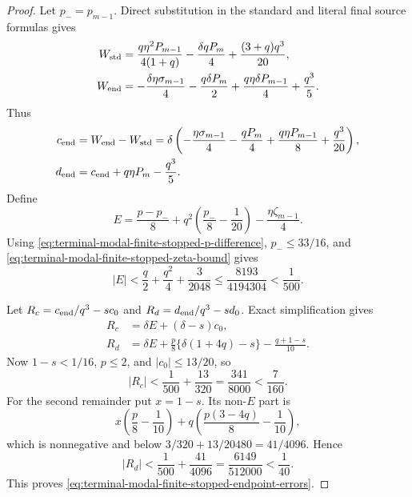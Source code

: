 \begin{proof}
Let $p_-=p_{m-1}$.  Direct substitution in the standard and literal final
source formulas gives
\begin{align}
 W_{\rm std}&=\frac{q\eta^2P_{m-1}}{4(1+q)}
 -\frac{\delta qP_m}{4}+\frac{(3+q)q^3}{20},
 \label{eq:terminal-modal-finite-stopped-Wstd}\\
 W_{\rm end}&=-\frac{\delta\eta\sigma_{m-1}}4
 -\frac{q\delta P_m}{2}+\frac{q\eta\delta P_{m-1}}4+\frac{q^3}{5}.
 \label{eq:terminal-modal-finite-stopped-Wend}
\end{align}
Thus
\begin{align}
 c_{\rm end}&=W_{\rm end}-W_{\rm std}
 =\delta\left(-\frac{\eta\sigma_{m-1}}4-\frac{qP_m}{4}
 +\frac{q\eta P_{m-1}}8+\frac{q^3}{20}\right),
 \label{eq:terminal-modal-finite-stopped-cend}\\
 d_{\rm end}&=c_{\rm end}+q\eta P_m-\frac{q^3}{5}.
 \label{eq:terminal-modal-finite-stopped-dend}
\end{align}
Define
\begin{equation}
 E=\frac{p-p_-}{8}+q^2\left(\frac{p_-}{8}-\frac1{20}\right)
 -\frac{\eta\zeta_{m-1}}4.
\end{equation}
Using \eqref{eq:terminal-modal-finite-stopped-p-difference},
$p_-\le33/16$, and
\eqref{eq:terminal-modal-finite-stopped-zeta-bound} gives
\begin{equation}
 |E|<\frac q2+\frac{q^2}{4}+\frac3{2048}
 \le\frac{8193}{4194304}<\frac1{500}.
 \label{eq:terminal-modal-finite-stopped-E-bound}
\end{equation}

Let
$R_c=c_{\rm end}/q^3-sc_0$ and
$R_d=d_{\rm end}/q^3-sd_0$.  Exact simplification gives
\begin{align}
 R_c&=\delta E+(\delta-s)c_0,
 \label{eq:terminal-modal-finite-stopped-Rc}\\
 R_d&=\delta E+\frac p8\{\delta(1+4q)-s\}
 -\frac{q+1-s}{10}.
 \label{eq:terminal-modal-finite-stopped-Rd}
\end{align}
Now $1-s<1/16$, $p\le2$, and $|c_0|\le13/20$, so
\begin{equation}
 |R_c|<\frac1{500}+\frac{13}{320}
 =\frac{341}{8000}<\frac7{160}.
\end{equation}
For the second remainder put $x=1-s$.  Its non-$E$ part is
\begin{equation}
 x\left(\frac p8-\frac1{10}\right)
 +q\left(\frac{p(3-4q)}8-\frac1{10}\right),
\end{equation}
which is nonnegative and below
$3/320+13/20480=41/4096$.  Hence
\begin{equation}
 |R_d|<\frac1{500}+\frac{41}{4096}
 =\frac{6149}{512000}<\frac1{40}.
\end{equation}
This proves \eqref{eq:terminal-modal-finite-stopped-endpoint-errors}.


\end{proof}

